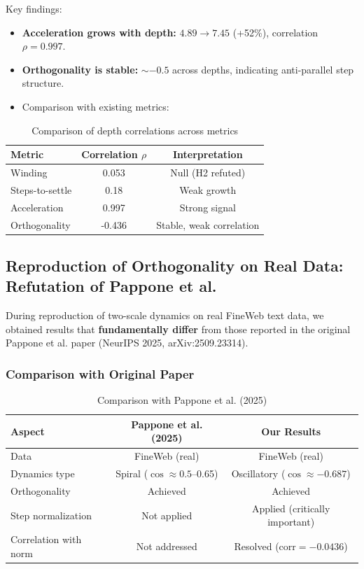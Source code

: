 Key findings:
\begin{itemize}
    \item \textbf{Acceleration grows with depth:} $4.89 \rightarrow 7.45$ (+52\%), correlation $\rho = 0.997$.
    \item \textbf{Orthogonality is stable:} $\sim -0.5$ across depths, indicating anti-parallel step structure.
    \item Comparison with existing metrics:
\end{itemize}

\begin{table}[h]
\centering
\caption{Comparison of depth correlations across metrics}
\begin{tabular}{lcc}
\toprule
Metric & Correlation $\rho$ & Interpretation \\
\midrule
Winding & 0.053 & Null (H2 refuted) \\
Steps-to-settle & 0.18 & Weak growth \\
Acceleration & 0.997 & Strong signal \\
Orthogonality & -0.436 & Stable, weak correlation \\
\bottomrule
\end{tabular}
\end{table}

\subsection{Reproduction of Orthogonality on Real Data: Refutation of Pappone et al.}

During reproduction of two-scale dynamics on real FineWeb text data, we obtained results that \textbf{fundamentally differ} from those reported in the original Pappone et al. paper (NeurIPS 2025, arXiv:2509.23314).

\subsubsection{Comparison with Original Paper}

\begin{table}[h]
\centering
\caption{Comparison with Pappone et al. (2025)}
\begin{tabular}{lcc}
\toprule
Aspect & Pappone et al. (2025) & Our Results \\
\midrule
Data & FineWeb (real) & FineWeb (real) \\
Dynamics type & Spiral ($\cos \approx 0.5$--0.65) & Oscillatory ($\cos \approx -0.687$) \\
Orthogonality & Achieved & Achieved \\
Step normalization & Not applied & Applied (critically important) \\
Correlation with norm & Not addressed & Resolved ($\text{corr} = -0.0436$) \\
\bottomrule
\end{tabular}
\end{table}

